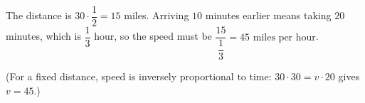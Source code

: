 The distance is $30\cdot\dfrac12=15$ miles. Arriving $10$ minutes earlier means taking $20$ minutes, which is $\dfrac13$ hour, so the speed must be $\dfrac{15}{\dfrac13}=\boxed{45\text{ miles per hour}}$.

(For a fixed distance, speed is inversely proportional to time: $30\cdot30=v\cdot20$ gives $v=45$.)
